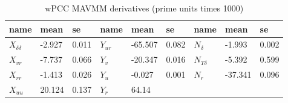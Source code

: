\begin{table}[!htb]
    \footnotesize
    \centering
    \caption{wPCC MAVMM derivatives (prime units times 1000)}
    \label{\detokenize{06.10_results_wpcc:wpcc-derivatives}}
    \begin{tabular}{|T|T|T|T|T|T|T|T|T|}
\hline


name
&

mean
&

se
&

name
&

mean
&

se
&

name
&

mean
&

se
\\
\hline

\( X_{\delta\delta} \)
&

-2.927
&

0.011
&

\( Y_{ur} \)
&

-65.507
&

0.082
&

\( N_{\delta} \)
&

-1.993
&

0.002
\\


\( X_{vr} \)
&

-7.737
&

0.066
&

\( Y_{v} \)
&

-20.347
&

0.016
&

\( N_{T\delta} \)
&

-5.392
&

0.599
\\


\( X_{rr} \)
&

-1.413
&

0.026
&

\( Y_{u} \)
&

-0.027
&

0.001
&

\( N_{r} \)
&

-37.341
&

0.096
\\


\( X_{uu} \)
&

20.124
&

0.137
&

\( Y_{r} \)
&

64.14
&


\end{tabular}
\end{table}

